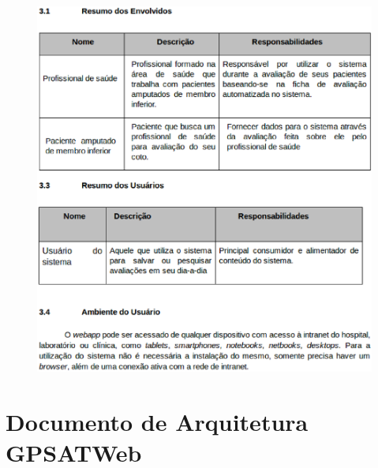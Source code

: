 \begin{apendicesenv}
\begin{figure}[H]
		        \includegraphics[keepaspectratio=true, scale=0.7]{editaveis/images/visaopag2.eps}
	\end{figure}

\chapter{Documento de Arquitetura GPSATWeb}
	

\end{apendicesenv}
